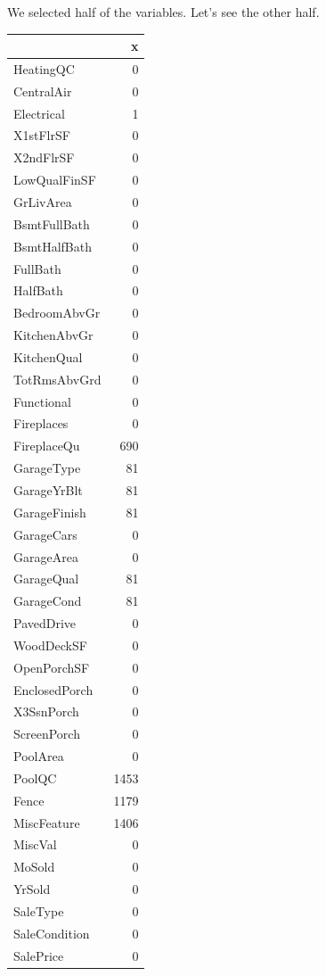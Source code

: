 \documentclass[
]{article}
\begin{document}
We selected half of the variables. Let's see the other half.

\begin{longtable}[]{@{}lr@{}}
\toprule
& x \\
\midrule
\endhead
HeatingQC & 0 \\
CentralAir & 0 \\
Electrical & 1 \\
X1stFlrSF & 0 \\
X2ndFlrSF & 0 \\
LowQualFinSF & 0 \\
GrLivArea & 0 \\
BsmtFullBath & 0 \\
BsmtHalfBath & 0 \\
FullBath & 0 \\
HalfBath & 0 \\
BedroomAbvGr & 0 \\
KitchenAbvGr & 0 \\
KitchenQual & 0 \\
TotRmsAbvGrd & 0 \\
Functional & 0 \\
Fireplaces & 0 \\
FireplaceQu & 690 \\
GarageType & 81 \\
GarageYrBlt & 81 \\
GarageFinish & 81 \\
GarageCars & 0 \\
GarageArea & 0 \\
GarageQual & 81 \\
GarageCond & 81 \\
PavedDrive & 0 \\
WoodDeckSF & 0 \\
OpenPorchSF & 0 \\
EnclosedPorch & 0 \\
X3SsnPorch & 0 \\
ScreenPorch & 0 \\
PoolArea & 0 \\
PoolQC & 1453 \\
Fence & 1179 \\
MiscFeature & 1406 \\
MiscVal & 0 \\
MoSold & 0 \\
YrSold & 0 \\
SaleType & 0 \\
SaleCondition & 0 \\
SalePrice & 0 \\
\bottomrule
\end{longtable}
\end{document}
